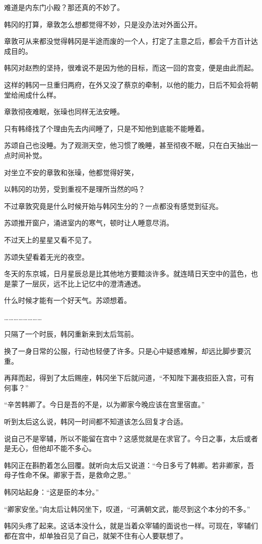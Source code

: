 难道是内东门小殿？那还真的不妙了。

韩冈的打算，章敦怎么想都觉得不妙，只是没办法对外面公开。

章敦可从来都没觉得韩冈是半途而废的一个人，打定了主意之后，都会千方百计达成目的。

韩冈对赵煦的坚持，很难说不是因为他的目标，而这一回的宫变，便是由此而起。

这样的韩冈一旦重归两府，在外又没了蔡京的牵制，以他的能力，日后不知会将朝堂给闹成什么样。

章敦彻夜难眠，张璪也同样无法安睡。

只有韩绛找了个理由先去内间睡了，只是不知他到底能不能睡着。

苏颂自己也没睡。为了观测天空，他习惯了晚睡，甚至彻夜不眠，只在白天抽出一点时间补觉。

对坐立不安的章敦和张璪，他都觉得好笑，

以韩冈的功劳，受到重视不是理所当然的吗？

不过章敦究竟是什么时候开始与韩冈生分的？一点都没有感觉到征兆。

苏颂推开窗户，涌进室内的寒气，顿时让人睡意尽消。

不过天上的星星又看不见了。

苏颂失望看着无光的夜空。

冬天的东京城，日月星辰总是比其他地方要黯淡许多。就连晴日天空中的蓝色，也是蒙了一层灰，远不比上记忆中的澄清通透。

什么时候才能有一个好天气。苏颂想着。

……………………

只隔了一个时辰，韩冈重新来到太后驾前。

换了一身日常的公服，行动也轻便了许多。只是心中疑惑难解，却远比脚步要沉重。

再拜而起，得到了太后赐座，韩冈坐下后就问道，“不知陛下漏夜招臣入宫，可有何事？”

“辛苦韩卿了。今日是吾的不是，以为卿家今晚应该在宫里宿直。”

听到太后这么说，韩冈一时间都不知道该怎么回复才合适。

说自己不是宰辅，所以不能留在宫中？这感觉就是在求官了。今日之事，太后或者是无心，但他却不能不多心。

韩冈正在斟酌着怎么回覆。就听向太后又说道：“今日多亏了韩卿。若非卿家，吾母子性命不保。卿家于吾，是救命之恩。”

韩冈站起身：“这是臣的本分。”

“卿家安坐。”向太后让韩冈坐下，叹道，“可满朝文武，能尽到这个本分的不多。”

韩冈头疼了起来。这话本没什么，就是当着众宰辅的面说也一样。可现在，宰辅们都在宫中，却单独召见了自己，就架不住有心人要联想了。

